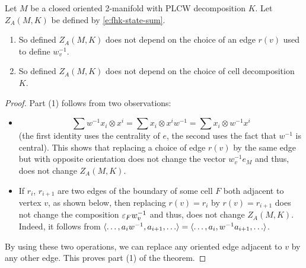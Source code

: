 \begin{theorem}\label{t:fhk1}
  Let $M$ be a closed oriented 2-manifold with PLCW decomposition $K$. Let
  $Z_A(M,K)$ be defined by \eqref{e:fhk-state-sum}.
  \begin{enumerate}
    \item So defined $Z_A(M,K)$ does not depend on the choice of an edge $r(v)$
      used to define $w^{-1}_v$.
    \item So defined $Z_A(M,K)$ does not depend on the choice of cell
      decomposition $K$.
  \end{enumerate}
\end{theorem}
\begin{proof}
  Part (1) follows from two observations:
  \begin{itemize}
    \item
      $$
      \sum w^{-1}x_i\otimes x^i=
      \sum x_i\otimes x^i w^{-1}=
      \sum x_i\otimes w^{-1}x^i
      $$
      (the first identity uses the centrality of $e$, the second uses the fact
      that  $w^{-1}$ is central). This shows that replacing a choice of edge
      $r(v)$ by the same edge but with opposite orientation does not change the
      vector $w^{-1}_ve_M$ and thus, does not change $Z_A(M,K)$.
    \item
      If $r_i$, $r_{i+1}$ are two edges of the boundary of some cell $F$ both
      adjacent to vertex $v$, as shown below, then replacing
      $r(v)=r_i$ by $r(v)= r_{i+1}$ does not change the composition
      $\varepsilon_F w^{-1}_v$ and thus, does not
      change $Z_A(M,K)$. Indeed, it follows from
      $\<\dots, a_{i}w^{-1}, a_{i+1}, \dots\> =
      \<\dots, a_{i}, w^{-1}a_{i+1}, \dots\>$.

      \begin{center}
      \end{center}

  \end{itemize}
  By using these two operations, we can replace any oriented edge adjacent
  to $v$ by any other edge. This proves part (1) of the theorem.


\end{proof}
